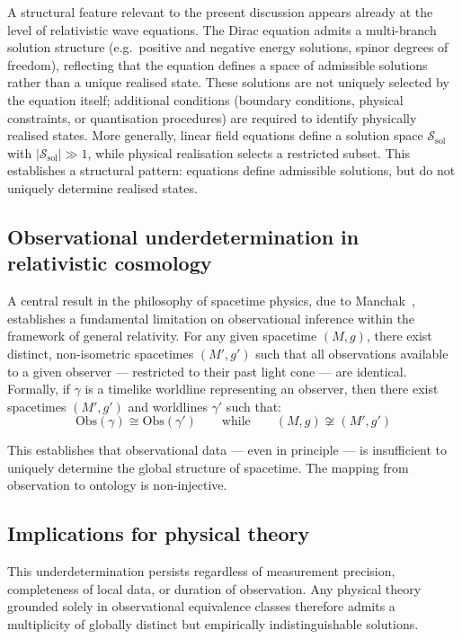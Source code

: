 \documentclass[12pt]{article}
\begin{document}
A structural feature relevant to the present discussion appears already at the level of relativistic wave equations. The Dirac equation admits a multi-branch solution structure (e.g.\ positive and negative energy solutions, spinor degrees of freedom), reflecting that the equation defines a space of admissible solutions rather than a unique realised state. These solutions are not uniquely selected by the equation itself; additional conditions (boundary conditions, physical constraints, or quantisation procedures) are required to identify physically realised states. More generally, linear field equations define a solution space $\mathcal{S}_{\mathrm{sol}}$ with $|\mathcal{S}_{\mathrm{sol}}| \gg 1$, while physical realisation selects a restricted subset. This establishes a structural pattern: equations define admissible solutions, but do not uniquely determine realised states.

\subsection{Observational underdetermination in relativistic cosmology}

A central result in the philosophy of spacetime physics, due to Manchak~\citep{Manchak2009}, establishes a fundamental limitation on observational inference within the framework of general relativity. For any given spacetime $(M, g)$, there exist distinct, non-isometric spacetimes $(M', g')$ such that all observations available to a given observer --- restricted to their past light cone --- are identical. Formally, if $\gamma$ is a timelike worldline representing an observer, then there exist spacetimes $(M', g')$ and worldlines $\gamma'$ such that:
\begin{equation}
    \mathrm{Obs}(\gamma) \cong \mathrm{Obs}(\gamma')
    \qquad \text{while} \qquad
    (M, g) \not\cong (M', g')
\end{equation}

This establishes that observational data --- even in principle --- is insufficient to uniquely determine the global structure of spacetime. The mapping from observation to ontology is non-injective.

\subsection{Implications for physical theory}

This underdetermination persists regardless of measurement precision, completeness of local data, or duration of observation. Any physical theory grounded solely in observational equivalence classes therefore admits a multiplicity of globally distinct but empirically indistinguishable solutions.
\end{document}
